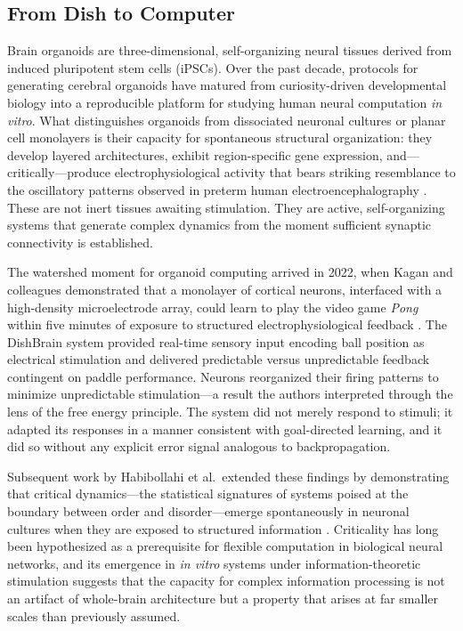 
\subsection{From Dish to Computer}

Brain organoids are three-dimensional, self-organizing neural tissues derived from induced pluripotent stem cells (iPSCs). Over the past decade, protocols for generating cerebral organoids have matured from curiosity-driven developmental biology into a reproducible platform for studying human neural computation \emph{in vitro}. What distinguishes organoids from dissociated neuronal cultures or planar cell monolayers is their capacity for spontaneous structural organization: they develop layered architectures, exhibit region-specific gene expression, and---critically---produce electrophysiological activity that bears striking resemblance to the oscillatory patterns observed in preterm human electroencephalography \cite{fitzgerald2024oscillation}. These are not inert tissues awaiting stimulation. They are active, self-organizing systems that generate complex dynamics from the moment sufficient synaptic connectivity is established.

The watershed moment for organoid computing arrived in 2022, when Kagan and colleagues demonstrated that a monolayer of cortical neurons, interfaced with a high-density microelectrode array, could learn to play the video game \emph{Pong} within five minutes of exposure to structured electrophysiological feedback \cite{kagan2022dishbrain}. The DishBrain system provided real-time sensory input encoding ball position as electrical stimulation and delivered predictable versus unpredictable feedback contingent on paddle performance. Neurons reorganized their firing patterns to minimize unpredictable stimulation---a result the authors interpreted through the lens of the free energy principle. The system did not merely respond to stimuli; it adapted its responses in a manner consistent with goal-directed learning, and it did so without any explicit error signal analogous to backpropagation.

Subsequent work by Habibollahi et al.\ extended these findings by demonstrating that critical dynamics---the statistical signatures of systems poised at the boundary between order and disorder---emerge spontaneously in neuronal cultures when they are exposed to structured information \cite{habibollahi2023critical}. Criticality has long been hypothesized as a prerequisite for flexible computation in biological neural networks, and its emergence in \emph{in vitro} systems under information-theoretic stimulation suggests that the capacity for complex information processing is not an artifact of whole-brain architecture but a property that arises at far smaller scales than previously assumed.


